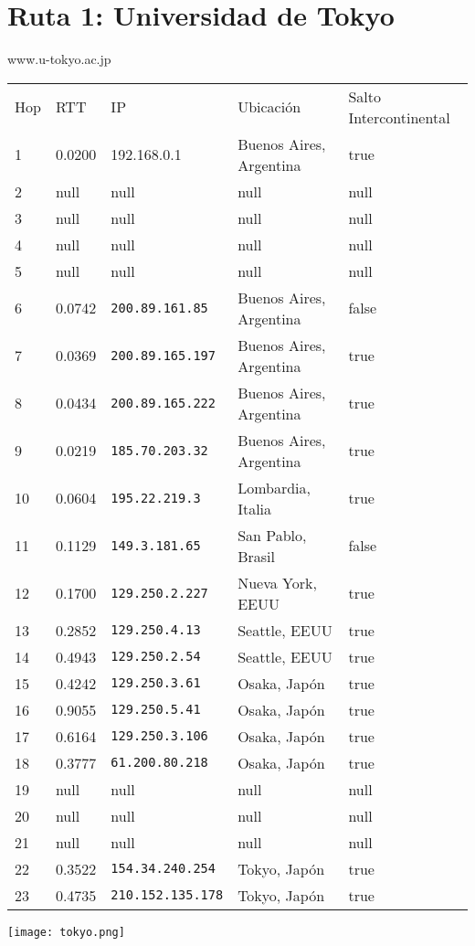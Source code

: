 \section{Ruta 1: Universidad de Tokyo}

www.u-tokyo.ac.jp

\begin{tabular}{l | l | l | l | l}
Hop & RTT & IP & Ubicación & Salto Intercontinental\\
1 & 0.0200 & 192.168.0.1 & Buenos Aires, Argentina & true\\
2 & null & null & null & null\\
3 & null & null & null & null\\
4 & null & null & null & null\\
5 & null & null & null & null\\
6 & 0.0742 & \texttt{200.89.161.85} & Buenos Aires, Argentina & false\\
7 & 0.0369 & \texttt{200.89.165.197} & Buenos Aires, Argentina & true\\
8 & 0.0434 & \texttt{200.89.165.222} & Buenos Aires, Argentina & true\\
9 & 0.0219 & \texttt{185.70.203.32} & Buenos Aires, Argentina & true\\
10 & 0.0604 & \texttt{195.22.219.3} & Lombardia, Italia & true\\
11 & 0.1129 & \texttt{149.3.181.65} & San Pablo, Brasil & false\\
12 & 0.1700 & \texttt{129.250.2.227} & Nueva York, EEUU & true\\
13 & 0.2852 & \texttt{129.250.4.13} & Seattle, EEUU & true\\
14 & 0.4943 & \texttt{129.250.2.54} & Seattle, EEUU & true\\
15 & 0.4242 & \texttt{129.250.3.61} & Osaka, Japón & true\\
16 & 0.9055 & \texttt{129.250.5.41} & Osaka, Japón & true\\
17 & 0.6164 & \texttt{129.250.3.106} & Osaka, Japón & true\\
18 & 0.3777 & \texttt{61.200.80.218} & Osaka, Japón & true\\
19 & null & null & null & null\\
20 & null & null & null & null\\
21 & null & null & null & null\\
22 & 0.3522 & \texttt{154.34.240.254} & Tokyo, Japón & true\\
23 & 0.4735 & \texttt{210.152.135.178} & Tokyo, Japón & true\\
\end{tabular}

\texttt{[image: tokyo.png]}